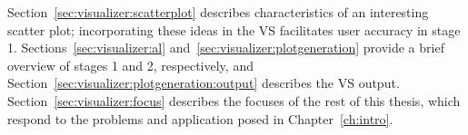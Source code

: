 Section~\ref{sec:visualizer:scatterplot} describes characteristics of an 
interesting scatter plot; incorporating these ideas in the VS facilitates user 
accuracy in stage 1. 
Sections~\ref{sec:visualizer:al} and~\ref{sec:visualizer:plotgeneration} 
provide a brief overview of stages 1 and 2, respectively, and 
Section~\ref{sec:visualizer:plotgeneration:output} describes the VS output.
Section~\ref{sec:visualizer:focus} describes the focuses of the rest of this 
thesis, which respond to the problems and application posed in 
Chapter~\ref{ch:intro}.





